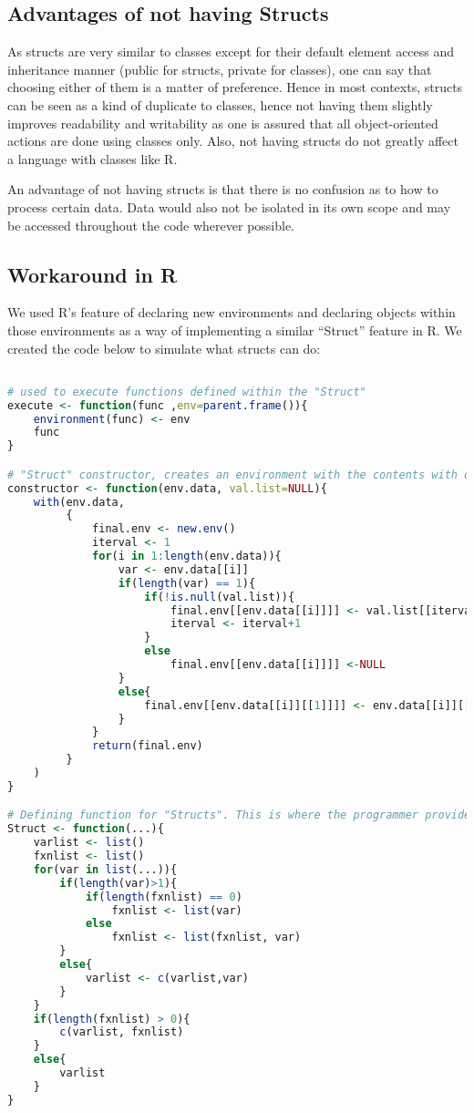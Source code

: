 \documentclass[12pt]{article}
\begin{document}
\subsection{Advantages of not having Structs}
As structs are very similar to classes except for their default element access and inheritance manner (public for structs, private for classes), one can say that choosing either of them is a matter of preference. Hence in most contexts, structs can be seen as a kind of duplicate to classes, hence not having them slightly improves readability and writability as one is assured that all object-oriented actions are done using classes only. Also, not having structs do not greatly affect a language with classes like R.

An advantage of not having structs is that there is no confusion as to how to process certain data. Data would also not be isolated in its own scope and may be accessed throughout the code wherever possible. 

\subsection{Workaround in R}

We used R's feature of declaring new environments and declaring objects within those environments as a way of implementing a similar ``Struct'' feature in R. We created the code below to simulate what structs can do:

\begin{lstlisting}[language=R]

# used to execute functions defined within the "Struct"
execute <- function(func ,env=parent.frame()){
    environment(func) <- env
    func
}

# "Struct" constructor, creates an environment with the contents with or without values
constructor <- function(env.data, val.list=NULL){
    with(env.data,
         {
             final.env <- new.env()
             iterval <- 1
             for(i in 1:length(env.data)){
                 var <- env.data[[i]]
                 if(length(var) == 1){
                     if(!is.null(val.list)){
                         final.env[[env.data[[i]]]] <- val.list[[iterval]]
                         iterval <- iterval+1
                     }
                     else
                         final.env[[env.data[[i]]]] <-NULL
                 }
                 else{
                     final.env[[env.data[[i]][[1]]]] <- env.data[[i]][[2]]
                 }
             }
             return(final.env)
         }
    )
}

# Defining function for "Structs". This is where the programmer provides variable names and functions to be used.
Struct <- function(...){
    varlist <- list()
    fxnlist <- list()
    for(var in list(...)){
        if(length(var)>1){
            if(length(fxnlist) == 0)
                fxnlist <- list(var)
            else
                fxnlist <- list(fxnlist, var)
        }
        else{
            varlist <- c(varlist,var)
        }
    }
    if(length(fxnlist) > 0){
        c(varlist, fxnlist)
    }
    else{
        varlist
    }
}
\end{lstlisting}
\end{document}
